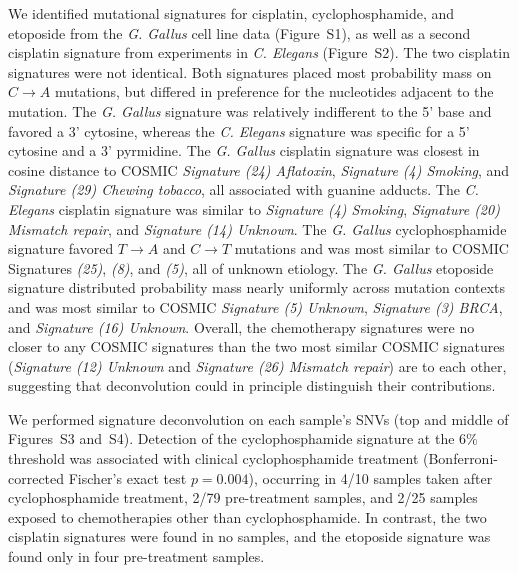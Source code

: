 \documentclass[linenumbers]{bmcart}
\begin{document}
We identified mutational signatures for cisplatin, cyclophosphamide, and etoposide from the \textit{G. Gallus} cell line data (Figure~S1), as well as a second cisplatin signature from experiments in \textit{C. Elegans} (Figure~S2). The two cisplatin signatures were not identical. Both signatures placed most probability mass on $C \rightarrow A$ mutations, but differed in preference for the nucleotides adjacent to the mutation. The \textit{G. Gallus} signature was relatively indifferent to the 5' base and favored a 3' cytosine, whereas the \textit{C. Elegans} signature was specific for a 5' cytosine and a 3' pyrmidine. The \textit{G. Gallus} cisplatin signature was closest in cosine distance to COSMIC \textit{Signature (24) Aflatoxin}, \textit{Signature (4) Smoking}, and \textit{Signature (29) Chewing tobacco}, all associated with guanine adducts. The \textit{C. Elegans} cisplatin signature was similar to \textit{Signature (4) Smoking}, \textit{Signature (20) Mismatch repair}, and \textit{Signature (14) Unknown}. The \textit{G. Gallus} cyclophosphamide signature favored $T \rightarrow A$ and $C \rightarrow T$ mutations and was most similar to COSMIC Signatures \textit{(25)}, \textit{(8)}, and \textit{(5)}, all of unknown etiology. The \textit{G. Gallus} etoposide signature distributed probability mass nearly uniformly across mutation contexts and was most similar to COSMIC \textit{Signature (5) Unknown}, \textit{Signature (3) BRCA}, and \textit{Signature (16) Unknown}. Overall, the chemotherapy signatures were no closer to any COSMIC signatures than the two most similar COSMIC signatures (\textit{Signature (12) Unknown} and \textit{Signature (26) Mismatch repair}) are to each other, suggesting that deconvolution could in principle distinguish their contributions.

We performed signature deconvolution on each sample's SNVs (top and middle of Figures~S3 and~S4). Detection of the cyclophosphamide signature at the 6\% threshold was associated with clinical cyclophosphamide treatment (Bonferroni-corrected Fischer's exact test $p = 0.004$), occurring in 4/10 samples taken after cyclophosphamide treatment, 2/79 pre-treatment samples, and 2/25 samples exposed to chemotherapies other than cyclophosphamide. In contrast, the two cisplatin signatures were found in no samples, and the etoposide signature was found only in four pre-treatment samples.
\end{document}
